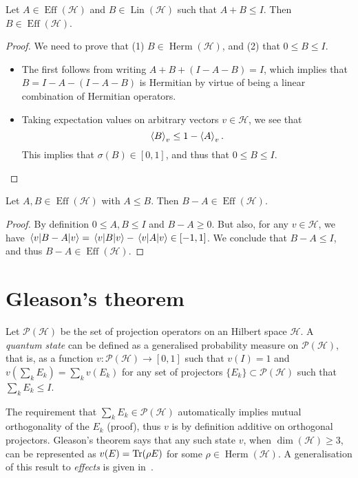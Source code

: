 \documentclass[12pt]{report}
\newcommand{\on}[1]{\operatorname{#1}}
\newcommand{\calH}{{\mathcal{H}}}
\newcommand{\calP}{{\mathcal{P}}}
\DeclareMathOperator{\Herm}{Herm}
\DeclareMathOperator{\Lin}{Lin}
\begin{document}
\begin{prop}
	Let $A\in\on{Eff}(\calH)$ and $B\in\Lin(\calH)$ such that $A+B\le I$.
	Then $B\in\on{Eff}(\calH)$.
\end{prop}
\begin{proof}
	We need to prove that (1) $B\in\Herm(\calH)$, and (2) that $0\le B\le I$.
	\begin{itemize}
		\item The first follows from writing $A+B+(I-A-B)=I$, which implies that $B=I - A - (I-A-B)$ is Hermitian by virtue of being a linear combination of Hermitian operators.
		\item Taking expectation values on arbitrary vectors $v\in\calH$, we see that
		\begin{equation}
			\expval{B}_v \le 1 - \expval{A}_v.
		\end{equation}
		This implies that $\sigma(B)\in[0,1]$, and thus that $0\le B\le I$.
	\end{itemize}
\end{proof}

\begin{prop}
	Let $A,B\in\on{Eff}(\calH)$ with $A\le B$. Then $B-A\in\on{Eff}(\calH)$.
	\label{prop:diff_of_effects_is_effect}
\end{prop}
\begin{proof}
	By definition $0\le A,B\le I$ and $B-A\ge 0$.
	But also, for any $v\in\calH$, we have
	$\mel{v}{B-A}{v}=\mel{v}{B}{v}-\mel{v}{A}{v}\in[-1,1]$.
	We conclude that $B-A\le I$, and thus $B-A\in\on{Eff}(\calH)$.
\end{proof}


\section{Gleason's theorem}

\begin{defn}
	Let $\calP(\calH)$ be the set of projection operators on an Hilbert space $\calH$. A \emph{quantum state} can be defined as a generalised probability measure on $\calP(\calH)$, that is, as a function $v:\calP(\calH)\to[0,1]$ such that $v(I)=1$ and
	$v(\sum_k E_k) = \sum_k v(E_k)$
	for any set of projectors $\{E_k\}\subset\calP(\calH)$ such that $\sum_k E_k\le I$.
\end{defn}
The requirement that $\sum_k E_k\in\calP(\calH)$ automatically implies mutual orthogonality of the $E_k$ (proof), thus $v$ is by definition additive on orthogonal projectors.
Gleason's theorem says that any such state $v$, when $\dim(\calH)\ge3$, can be represented as $v(E)=\Tr(\rho E)$ for some $\rho\in\Herm(\calH)$.
A generalisation of this result to \emph{effects} is given in~\parencite{busch2003quantum,caves2004gleasontype}.
\end{document}
